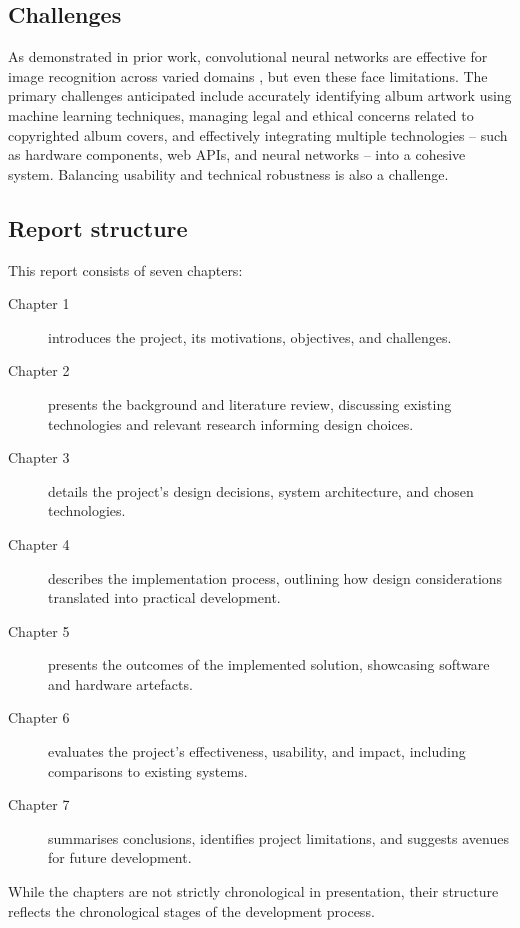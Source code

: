         \subsection{Challenges}
    
            As demonstrated in prior work, convolutional neural networks are effective for image recognition across varied domains \cite{cnnsforimagerecognition, imagenetclasscnn}, but even these face limitations. The primary challenges anticipated include accurately identifying album artwork using machine learning techniques, managing legal and ethical concerns related to copyrighted album covers, and effectively integrating multiple technologies -- such as hardware components, web APIs, and neural networks -- into a cohesive system. Balancing usability and technical robustness is also a challenge.
        
        \subsection{Report structure} %
        
            This report consists of seven chapters:
            \begin{description}
                \item[Chapter 1] introduces the project, its motivations, objectives, and challenges.
                \item[Chapter 2] presents the background and literature review, discussing existing technologies and relevant research informing design choices.
                \item[Chapter 3] details the project's design decisions, system architecture, and chosen technologies.
                \item[Chapter 4] describes the implementation process, outlining how design considerations translated into practical development.
                \item[Chapter 5] presents the outcomes of the implemented solution, showcasing software and hardware artefacts.
                \item[Chapter 6] evaluates the project's effectiveness, usability, and impact, including comparisons to existing systems.
                \item[Chapter 7] summarises conclusions, identifies project limitations, and suggests avenues for future development.
            \end{description}
    
            While the chapters are not strictly chronological in presentation, their structure reflects the chronological stages of the development process.
    
